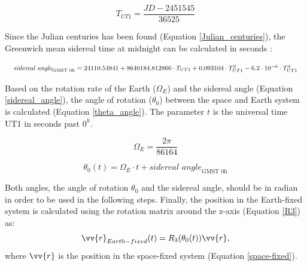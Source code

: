 \begin{equation}
\label{Julian_centuries}
T_{UT1} = \frac{JD - 2451545}{36525}
\end{equation}

Since the Julian centuries has been found (Equation \ref{Julian_centuries}), the Greenwich mean sidereal time at midnight can be calculated in seconds \cite{Vallado}:

\begin{equation}
\label{sidereal_angle}
\resizebox{\textwidth}{!}
{
$\textit{sidereal angle}_{\text{GMST 0h}} = 24110.54841 + 8640184.812866 \cdot T_{UT1} + 0.093104 \cdot T_{UT1}^{2} - 6.2 \cdot 10^{-6} \cdot T_{UT1}^{3}$
}
\end{equation}

Based on the rotation rate of the Earth ($\Omega_{E}$) and the sidereal angle (Equation \ref{sidereal_angle}), the angle of rotation ($\theta_{0}$) between the space and Earth system is calculated (Equation \ref{theta_angle}). The parameter $t$ is the universal time UT1 in seconds past $0^{h}$.

\begin{equation}
\label{rotation_rate}
\Omega_{E} = \frac{2 \pi}{86164}
\end{equation}


\begin{equation}
\label{theta_angle}
\theta_{0}(t) = \Omega_{E} \cdot t + \textit{sidereal angle}_{\text{GMST 0h}}
\end{equation}

Both angles, the angle of rotation $\theta_{0}$ and the sidereal angle, should be in radian in order to be used in the following steps. Finally, the position in the Earth-fixed system is calculated using the rotation matrix around the z-axis (Equation \ref{R3}) as:
\begin{equation}
\vv{r}_{Earth-fixed}(t) = R_{3}(\theta_{0}(t)) \vv{r},
\end{equation}
where $\vv{r}$ is the position in the space-fixed system (Equation \ref{space-fixed}).

